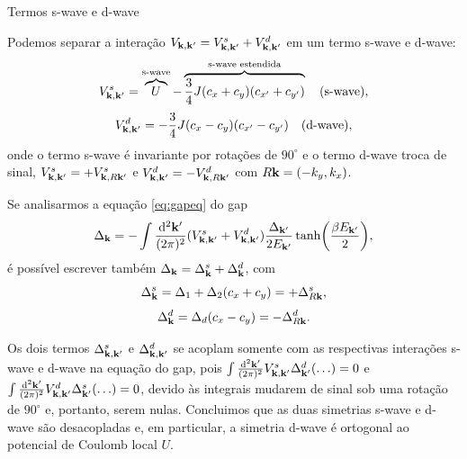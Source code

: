 \documentclass[8pt,aspectratio=169,xcolor={table,dvipsnames,usenames}]{beamer}
\begin{document}
\begin{frame}{Termos s-wave e d-wave}

Podemos separar a interação $V_{\vb{k},\vb{k}'} = V_{\vb{k},\vb{k}'}^s + V_{\vb{k},\vb{k}'}^d$ em um termo s-wave e d-wave:
$$
V_{\vb{k},\vb{k}'}^s =
\overbrace{U}^{\text{s-wave}} -
\overbrace{\frac{3}{4} J (c_x + c_y) (c_{x'} + c_{y'})}^{\text{s-wave estendida}}
\quad \text{(s-wave)},
$$
$$
V_{\vb{k},\vb{k}'}^d = - \frac{3}{4} J (c_x - c_y) (c_{x'} - c_{y'})
\quad \text{(d-wave)},
$$
onde o termo s-wave é invariante por rotações de $90^\circ$ e o termo d-wave troca de sinal, $V_{\vb{k},\vb{k}'}^s = + V_{\vb{k}, R\vb{k}'}^s$ e $V_{\vb{k},\vb{k}'}^d = - V_{\vb{k}, R\vb{k}'}^d$ com $R\vb{k} = (-k_y, k_x)$.

\n

Se analisarmos a equação \ref{eq:gapeq} do gap
$$
\Delta_{\vb{k}} = - \int \frac{\dd[2]{\vb{k}'}}{(2\pi)^2} (V_{\vb{k},\vb{k}'}^s + V_{\vb{k},\vb{k}'}^d) \frac{\Delta_{\vb{k}'}}{2 E_{\vb{k}'}} \tanh(\frac{\beta E_{\vb{k}'}}{2}),
$$
é possível escrever também $\Delta_{\vb{k}} = \Delta_{\vb{k}}^s + \Delta_{\vb{k}}^d$, com
$$
\Delta_{\vb{k}}^s = \Delta_1 + \Delta_ 2 (c_x + c_y) = + \Delta_{R\vb{k}}^s,
$$
$$
\Delta_{\vb{k}}^d = \Delta_d (c_x - c_y) = - \Delta_{R\vb{k}}^d.
$$

Os dois termos $\Delta_{\vb{k},\vb{k}'}^s$ e $\Delta_{\vb{k},\vb{k}'}^d$ se acoplam somente com as respectivas interações s-wave e d-wave na equação do gap, pois $\int \frac{\dd[2]{\vb{k}'}}{(2\pi)^2} V_{\vb{k},\vb{k}'}^s \Delta^d_{\vb{k}'} (\ldots) = 0$ e $\int \frac{\dd[2]{\vb{k}'}}{(2\pi)^2} V_{\vb{k},\vb{k}'}^d \Delta^s_{\vb{k}'} (\ldots) = 0$, devido às integrais mudarem de sinal sob uma rotação de $90^\circ$ e, portanto, serem nulas. Concluimos que as duas simetrias s-wave e d-wave são desacopladas e, em particular, a simetria d-wave é ortogonal ao potencial de Coulomb local $U$.


\end{frame}

\end{document}
